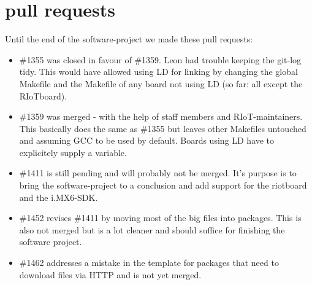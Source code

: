 \section{pull requests}

Until the end of the software-project we made these pull requests:
\begin{itemize}
\item \#1355 was closed in favour of \#1359. Leon had trouble keeping the git-log tidy.
This would have allowed using LD for linking by changing the global Makefile and the
Makefile of any board not using LD (so far: all except the RIoTboard).
\item \#1359 was merged - with the help of staff members and RIoT-maintainers.
This basically does the same as \#1355 but leaves other Makefiles untouched and
assuming GCC to be used by default. Boards using LD have to explicitely supply a
variable.
\item \#1411 is still pending and will probably not be merged.
It's purpose is to bring the software-project to a conclusion and add support for
the riotboard and the i.MX6-SDK.
\item \#1452 revises \#1411 by moving most of the big files into packages. This is also not merged but is a lot cleaner and should suffice for finishing the software project.
\item \#1462 addresses a mistake in the template for packages that need to download files via HTTP and is not yet merged.
\end{itemize}
